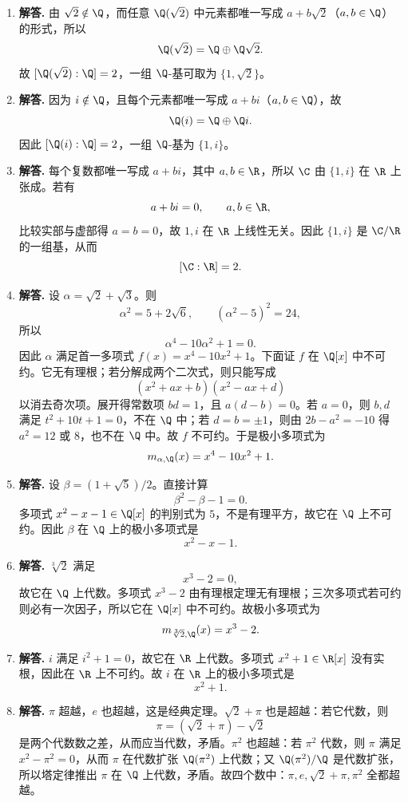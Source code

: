 \begin{enumerate}[label=\textbf{\arabic*.}, leftmargin=*, itemsep=1em]
\item \textbf{解答.} 由 $\sqrt2\notin\Q$，而任意 $\Q(\sqrt2)$ 中元素都唯一写成 $a+b\sqrt2$（$a,b\in\Q$）的形式，所以
\[
\Q(\sqrt2)=\Q\oplus \Q\sqrt2.
\]
故 $[\Q(\sqrt2):\Q]=2$，一组 $\Q$-基可取为 $\{1,\sqrt2\}$。

\item \textbf{解答.} 因为 $i\notin\Q$，且每个元素都唯一写成 $a+bi$（$a,b\in\Q$），故
\[
\Q(i)=\Q\oplus \Q i.
\]
因此 $[\Q(i):\Q]=2$，一组 $\Q$-基为 $\{1,i\}$。

\item \textbf{解答.} 每个复数都唯一写成 $a+bi$，其中 $a,b\in\R$，所以 $\C$ 由 $\{1,i\}$ 在 $\R$ 上张成。若有
\[
a+bi=0,\qquad a,b\in\R,
\]
比较实部与虚部得 $a=b=0$，故 $1,i$ 在 $\R$ 上线性无关。因此 $\{1,i\}$ 是 $\C/\R$ 的一组基，从而
\[
[\C:\R]=2.
\]

\item \textbf{解答.} 设 $\alpha=\sqrt2+\sqrt3$。则
\[
\alpha^2=5+2\sqrt6,
\qquad (\alpha^2-5)^2=24,
\]
所以
\[
\alpha^4-10\alpha^2+1=0.
\]
因此 $\alpha$ 满足首一多项式 $f(x)=x^4-10x^2+1$。下面证 $f$ 在 $\Q[x]$ 中不可约。它无有理根；若分解成两个二次式，则只能写成
\[
(x^2+ax+b)(x^2-ax+d)
\]
以消去奇次项。展开得常数项 $bd=1$，且 $a(d-b)=0$。若 $a=0$，则 $b,d$ 满足 $t^2+10t+1=0$，不在 $\Q$ 中；若 $d=b=\pm1$，则由 $2b-a^2=-10$ 得 $a^2=12$ 或 $8$，也不在 $\Q$ 中。故 $f$ 不可约。于是极小多项式为
\[
m_{\alpha,\Q}(x)=x^4-10x^2+1.
\]

\item \textbf{解答.} 设 $\beta=(1+\sqrt5)/2$。直接计算
\[
\beta^2-\beta-1=0.
\]
多项式 $x^2-x-1\in\Q[x]$ 的判别式为 $5$，不是有理平方，故它在 $\Q$ 上不可约。因此 $\beta$ 在 $\Q$ 上的极小多项式是
\[
x^2-x-1.
\]

\item \textbf{解答.} $\sqrt[3]{2}$ 满足
\[
x^3-2=0,
\]
故它在 $\Q$ 上代数。多项式 $x^3-2$ 由有理根定理无有理根；三次多项式若可约则必有一次因子，所以它在 $\Q[x]$ 中不可约。故极小多项式为
\[
m_{\sqrt[3]{2},\Q}(x)=x^3-2.
\]

\item \textbf{解答.} $i$ 满足 $i^2+1=0$，故它在 $\R$ 上代数。多项式 $x^2+1\in\R[x]$ 没有实根，因此在 $\R$ 上不可约。故 $i$ 在 $\R$ 上的极小多项式是
\[
x^2+1.
\]

\item \textbf{解答.} $\pi$ 超越，$e$ 也超越，这是经典定理。$\sqrt2+\pi$ 也是超越：若它代数，则
\[
\pi=(\sqrt2+\pi)-\sqrt2
\]
是两个代数数之差，从而应当代数，矛盾。$\pi^2$ 也超越：若 $\pi^2$ 代数，则 $\pi$ 满足 $x^2-\pi^2=0$，从而 $\pi$ 在代数扩张 $\Q(\pi^2)$ 上代数；又 $\Q(\pi^2)/\Q$ 是代数扩张，所以塔定律推出 $\pi$ 在 $\Q$ 上代数，矛盾。故四个数中：$\pi,e,\sqrt2+\pi,\pi^2$ 全都超越。


\end{enumerate}
